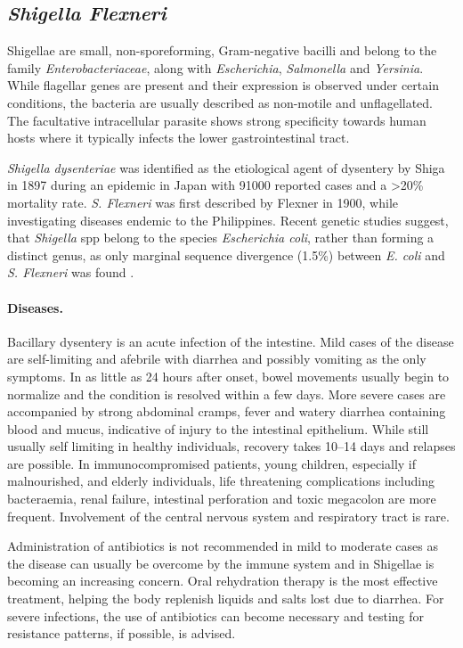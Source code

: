 \subsection{\textit{Shigella Flexneri}}
Shigellae are small, non-sporeforming, Gram-negative bacilli and belong to the family \textit{Enterobacteriaceae}, along with \textit{Escherichia}, \textit{Salmonella} and \textit{Yersinia}. While flagellar genes are present and their expression is observed under certain conditions, the bacteria are usually described as non-motile and unflagellated. The facultative intracellular parasite shows strong specificity towards human hosts where it typically infects the lower gastrointestinal tract.

\textit{Shigella dysenteriae} was identified as the etiological agent of dysentery by Shiga in 1897 during an epidemic in Japan with 91000 reported cases and a \textgreater 20\% mortality rate. \textit{S. Flexneri} was first described by Flexner in 1900, while investigating diseases endemic to the Philippines. Recent genetic studies suggest, that \textit{Shigella} \acrshort{spp} belong to the species \textit{Escherichia coli}, rather than forming a distinct genus, as only marginal sequence divergence (1.5\%) between \textit{E. coli} and \textit{S. Flexneri} was found \citep{Schroeder2008,Croxen2010}.

\paragraph{Diseases.}
Bacillary dysentery is an acute infection of the intestine. Mild cases of the disease are self-limiting and afebrile with diarrhea and possibly vomiting as the only symptoms. In as little as 24 hours after onset, bowel movements usually begin to normalize and the condition is resolved within a few days. More severe cases are accompanied by strong abdominal cramps, fever and watery diarrhea containing blood and mucus, indicative of injury to the intestinal epithelium. While still usually self limiting in healthy individuals, recovery takes 10--14 days and relapses are possible. In immunocompromised patients, young children, especially if malnourished, and elderly individuals, life threatening complications including bacteraemia, renal failure, intestinal perforation and toxic megacolon are more frequent. Involvement of the central nervous system and respiratory tract is rare.

Administration of antibiotics is not recommended in mild to moderate cases as the disease can usually be overcome by the immune system and  in Shigellae is becoming an increasing concern. Oral rehydration therapy is the most effective treatment, helping the body replenish liquids and salts lost due to diarrhea. For severe infections, the use of antibiotics can become necessary and testing for resistance patterns, if possible, is advised.

